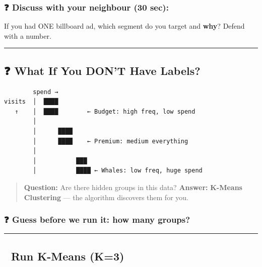 \documentclass[
]{article}
\begin{document}
\subsubsection{❓ Discuss with your neighbour (30
sec):}\label{discuss-with-your-neighbour-30-sec}

If you had ONE billboard ad, which segment do you target and
\textbf{why}? Defend with a number.

\begin{center}\rule{0.5\linewidth}{0.5pt}\end{center}

\subsection{❓ What If You DON'T Have
Labels?}\label{what-if-you-dont-have-labels}

\begin{verbatim}
        spend →
visits  │  ████
   ↑    │  ████        ← Budget: high freq, low spend
        │
        │      ████
        │      ████    ← Premium: medium everything
        │
        │           ███
        │           ████ ← Whales: low freq, huge spend
\end{verbatim}

\begin{quote}
\textbf{Question:} Are there hidden groups in this data?
\textbf{Answer:} \textbf{K-Means Clustering} --- the algorithm discovers
them for you.
\end{quote}

\subsubsection{❓ Guess before we run it: how many
groups?}\label{guess-before-we-run-it-how-many-groups}

\begin{center}\rule{0.5\linewidth}{0.5pt}\end{center}

\subsection{🤖 Run K-Means (K=3)}\label{run-k-means-k3}
\end{document}
